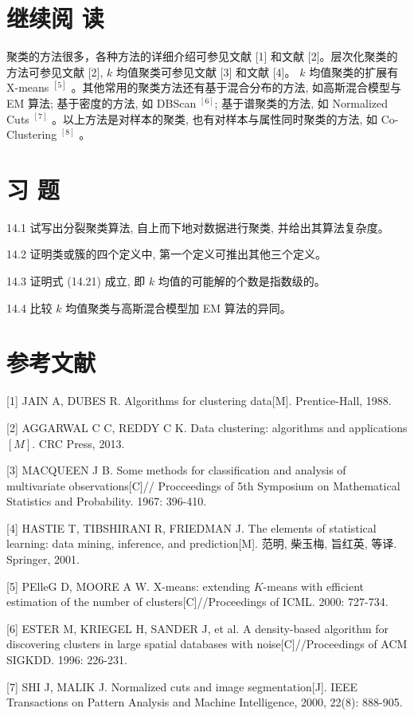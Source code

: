 \documentclass[10pt]{article}
\begin{document}
\section*{继续阅 读}
聚类的方法很多，各种方法的详细介绍可参见文献 [1] 和文献 [2]。层次化聚类的方法可参见文献 [2], $k$ 均值聚类可参见文献 [3] 和文献 [4]。 $k$ 均值聚类的扩展有 X-means ${ }^{[5]}$ 。其他常用的聚类方法还有基于混合分布的方法, 如高斯混合模型与 EM 算法; 基于密度的方法, 如 DBScan ${ }^{[6]}$; 基于谱聚类的方法, 如 Normalized Cuts ${ }^{[7]}$ 。以上方法是对样本的聚类, 也有对样本与属性同时聚类的方法, 如 Co-Clustering ${ }^{[8]}$ 。

\section*{习 题}
14.1 试写出分裂聚类算法, 自上而下地对数据进行聚类, 并给出其算法复杂度。

14.2 证明类或簇的四个定义中, 第一个定义可推出其他三个定义。

14.3 证明式 (14.21) 成立, 即 $k$ 均值的可能解的个数是指数级的。

14.4 比较 $k$ 均值聚类与高斯混合模型加 EM 算法的异同。

\section*{参考文献}
[1] JAIN A, DUBES R. Algorithms for clustering data[M]. Prentice-Hall, 1988.

[2] AGGARWAL C C, REDDY C K. Data clustering: algorithms and applications $[M]$. CRC Press, 2013.

[3] MACQUEEN J B. Some methods for classification and analysis of multivariate observations[C]// Procceedings of 5th Symposium on Mathematical Statistics and Probability. 1967: 396-410.

[4] HASTIE T, TIBSHIRANI R, FRIEDMAN J. The elements of statistical learning: data mining, inference, and prediction[M]. 范明, 柴玉梅, 旨红英, 等译. Springer, 2001.

[5] PElleG D, MOORE A W. X-means: extending $K$-means with efficient estimation of the number of clusters[C]//Proceedings of ICML. 2000: 727-734.

[6] ESTER M, KRIEGEL H, SANDER J, et al. A density-based algorithm for discovering clusters in large spatial databases with noise[C]//Proceedings of ACM SIGKDD. 1996: 226-231.

[7] SHI J, MALIK J. Normalized cuts and image segmentation[J]. IEEE Transactions on Pattern Analysis and Machine Intelligence, 2000, 22(8): 888-905.
\end{document}
